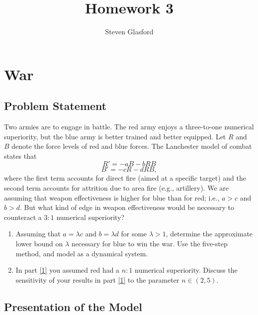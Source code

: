 \documentclass[12pt]{report}
\title{Homework 3}
\author{Steven Glasford}
\date{\parbox{\linewidth}{\centering%
    \today\endgraf\medskip
    Math-451-M001}}
\begin{document}
\maketitle
\tableofcontents

\chapter{War}

\section{Problem Statement}
Two armies are to engage in battle. The red army enjoys a three-to-one numerical superiority, but the blue army is better trained and better equipped. Let $R$ and $B$ denote the force levels of red and blue forces. The Lanchester model of combat states that $$R'=-aB-bRB$$ $$B'=-cR-dRB,$$ where the first term accounts for direct fire (aimed at a specific target) and the second term accounts for attrition due to area fire (e.g., artillery). We are assuming that weapon effectiveness is higher for blue than for red; i.e., $a>c$ and $b>d$. But what kind of edge in weapon effectiveness would be necessary to counteract a $3:1$ numerical superiority?

\begin{enumerate}[label=(\alph*),ref=(\alph*)]
    
    \item \label{1} Assuming that $a=\lambda c$ and $b=\lambda d$ for some $\lambda > 1$, determine the approximate lower bound on $\lambda$ necessary for blue to win the war. Use the five-step method, and model as a dynamical system.
    
    \item In part \ref{1} you assumed red had a $n:1$ numerical superiority. Discuss the sensitivity of your results in part \ref{1} to the parameter $n \in (2, 5)$.
    
\end{enumerate}

\section{Presentation of the Model}
\end{document}

